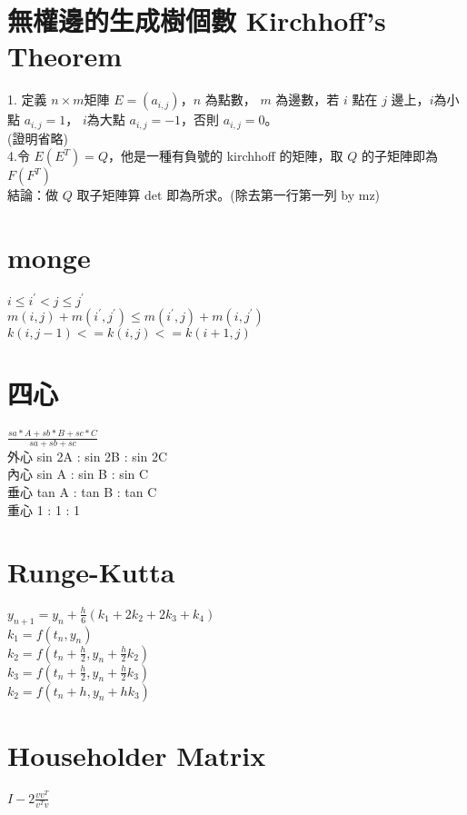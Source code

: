 \section{無權邊的生成樹個數 Kirchhoff's Theorem}
1. 定義 $n\times m$矩陣 $E=(a_{i,j})$，$n$ 為點數， $m$ 為邊數，若 $i$ 點在 $j$ 邊上，$i$為小點 $a_{i,j}=1$， $i$為大點 $a_{i,j}=-1$，否則 $a_{i,j}=0$。\\
(證明省略)
\\
4.令 $E(E^T)=Q$，他是一種有負號的 kirchhoff 的矩陣，取 $Q$ 的子矩陣即為 $F(F^T)$\\
結論：做 $Q$ 取子矩陣算 det 即為所求。(除去第一行第一列 by mz)

\section{monge}
$i \leq i^{'} < j \leq j^{'}$ \\
$m(i,j)+m(i^{'},j^{'}) \leq m(i^{'},j)+m(i,j^{'})$ \\
$k(i,j-1)<=k(i,j)<=k(i+1,j)$

\section{四心}
$\frac{sa*A+sb*B+sc*C}{sa+sb+sc}$ \\
外心 sin 2A : sin 2B : sin 2C \\
內心 sin  A : sin  B : sin  C \\
垂心 tan  A : tan  B : tan  C \\
重心      1 :      1 :      1 

\section{Runge-Kutta}
$y_{n+1}=y_n+\frac{h}{6}(k_1+2k_2+2k_3+k_4)$\\
$k_1=f(t_n,y_n)$\\
$k_2=f(t_n+\frac{h}{2},y_n+\frac{h}{2}k_2)$\\
$k_3=f(t_n+\frac{h}{2},y_n+\frac{h}{2}k_3)$\\
$k_2=f(t_n+h,y_n+hk_3)$

\section{Householder Matrix}
$I-2\frac{vv^T}{v^Tv}$
